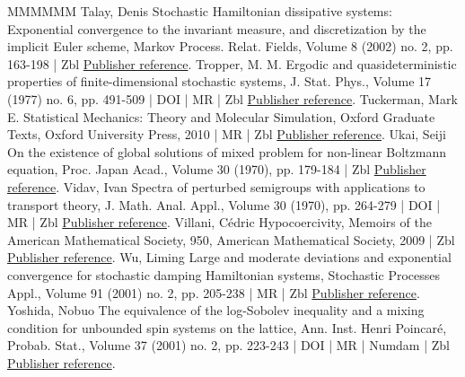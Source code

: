 \begin{thebibliography}{MMMMMM}
 Talay, Denis Stochastic Hamiltonian dissipative systems: Exponential convergence to the invariant measure, and discretization by the implicit Euler scheme, Markov Process. Relat. Fields, Volume 8 (2002) no. 2, pp. 163-198 | Zbl \href{https://ahl.centre-mersenne.org/item/AHL_2022__5__523_0/#Talay02}{Publisher reference}.
 Tropper, M. M. Ergodic and quasideterministic properties of finite-dimensional stochastic systems, J. Stat. Phys., Volume 17 (1977) no. 6, pp. 491-509 | DOI | MR | Zbl \href{https://ahl.centre-mersenne.org/item/AHL_2022__5__523_0/#Tropper77}{Publisher reference}.
 Tuckerman, Mark E. Statistical Mechanics: Theory and Molecular Simulation, Oxford Graduate Texts, Oxford University Press, 2010 | MR | Zbl \href{https://ahl.centre-mersenne.org/item/AHL_2022__5__523_0/#Tuckerman}{Publisher reference}.
 Ukai, Seiji On the existence of global solutions of mixed problem for non-linear Boltzmann equation, Proc. Japan Acad., Volume 30 (1970), pp. 179-184 | Zbl \href{https://ahl.centre-mersenne.org/item/AHL_2022__5__523_0/#Ukai74}{Publisher reference}.
 Vidav, Ivan Spectra of perturbed semigroups with applications to transport theory, J. Math. Anal. Appl., Volume 30 (1970), pp. 264-279 | DOI | MR | Zbl \href{https://ahl.centre-mersenne.org/item/AHL_2022__5__523_0/#Vidav70}{Publisher reference}.
 Villani, Cédric Hypocoercivity, Memoirs of the American Mathematical Society, 950, American Mathematical Society, 2009 | Zbl \href{https://ahl.centre-mersenne.org/item/AHL_2022__5__523_0/#Villani09}{Publisher reference}.
 Wu, Liming Large and moderate deviations and exponential convergence for stochastic damping Hamiltonian systems, Stochastic Processes Appl., Volume 91 (2001) no. 2, pp. 205-238 | MR | Zbl \href{https://ahl.centre-mersenne.org/item/AHL_2022__5__523_0/#Wu01}{Publisher reference}.
 Yoshida, Nobuo The equivalence of the log-Sobolev inequality and a mixing condition for unbounded spin systems on the lattice, Ann. Inst. Henri Poincaré, Probab. Stat., Volume 37 (2001) no. 2, pp. 223-243 | DOI | MR | Numdam | Zbl \href{https://ahl.centre-mersenne.org/item/AHL_2022__5__523_0/#yos2001}{Publisher reference}.
\end{thebibliography}
